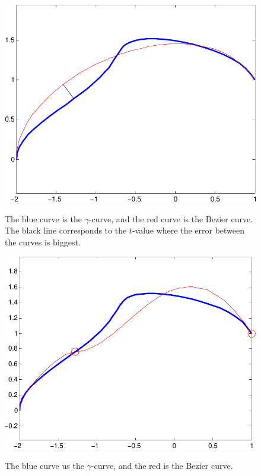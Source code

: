 \documentclass[10pt]{article}
\begin{document}
\begin{figure}
\centering
\begin{minipage}[t]{.4\textwidth}
\centering
\vspace{0pt}
    \includegraphics[scale=0.5]{kurvedeling1-crop.pdf}
    \label{fig:kurvedeling1}
    \caption{The blue curve is the $\gamma$-curve, and the red curve is the Bezier curve. The black line corresponds to the $t$-value where the error between the curves is biggest.}
\end{minipage}\hfill
\begin{minipage}[t]{.4\textwidth}
\centering
\vspace{0pt}
    \includegraphics[scale=0.5]{kurvedeling2-crop.pdf}
    \label{fig:kurvedeling2}
    \caption{The blue curve us the $\gamma$-curve, and the red is the Bezier curve.}
\end{minipage}
\end{figure}
\end{document}
